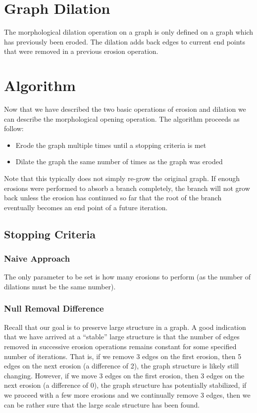 \documentclass{ComputationalAlgorithmsArticle}
\begin{document}
\section{Graph Dilation}
The morphological dilation operation on a graph is only defined on a graph which has previously been eroded. The dilation adds back edges to current end points that were removed in a previous erosion operation.

\section{Algorithm}
\label{sec:Algorithm}
Now that we have described the two basic operations of erosion and dilation we can describe the morphological opening operation. The algorithm proceeds as follow:
\begin{itemize}
 \item Erode the graph multiple times until a stopping criteria is met
 \item Dilate the graph the same number of times as the graph was eroded
\end{itemize}

Note that this typically does not simply re-grow the original graph. If enough erosions were performed to absorb a branch completely, the branch will not grow back unless the erosion has continued so far that the root of the branch eventually becomes an end point of a future iteration.

\subsection{Stopping Criteria}
\subsubsection{Naive Approach}
The only parameter to be set is how many erosions to perform (as the number of dilations must be the same number).
\subsubsection{Null Removal Difference}
Recall that our goal is to preserve large structure in a graph. A good indication that we have arrived at a ``stable'' large structure is that the number of edges removed in successive erosion operations remains constant for some specified number of iterations. That is, if we remove 3 edges on the first erosion, then 5 edges on the next erosion (a difference of 2), the graph structure is likely still changing. However, if we move 3 edges on the first erosion, then 3 edges on the next erosion (a difference of 0), the graph structure has potentially stabilized, if we proceed with a few more erosions and we continually remove 3 edges, then we can be rather sure that the large scale structure has been found.
\end{document}
